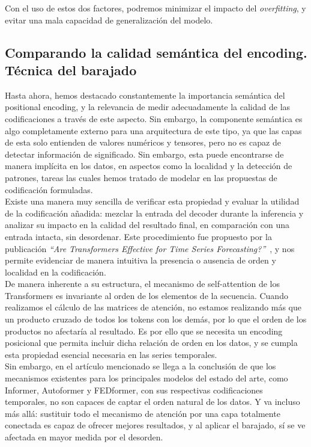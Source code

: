 Con el uso de estos dos factores, podremos minimizar el impacto del \textit{overfitting}, y evitar una mala capacidad de generalización del modelo.

\subsection{Comparando la calidad semántica del encoding. Técnica del barajado}

Hasta ahora, hemos destacado constantemente la importancia semántica del positional encoding, y la relevancia de medir adecuadamente la calidad de las codificaciones a través de este aspecto. Sin embargo, la componente semántica es algo completamente externo para una arquitectura de este tipo, ya que las capas de esta solo entienden de valores numéricos y tensores, pero no es capaz de detectar información de significado. Sin embargo, esta puede encontrarse de manera implícita en los datos, en aspectos como la localidad y la detección de patrones, tareas las cuales hemos tratado de modelar en las propuestas de codificación formuladas.\\

Existe una manera muy sencilla de verificar esta propiedad y evaluar la utilidad de la codificación añadida: mezclar la entrada del decoder durante la inferencia y analizar su impacto en la calidad del resultado final, en comparación con una entrada intacta, sin desordenar. Este procedimiento fue propuesto por la publicación \textit{``Are Transformers Effective for Time Series Forecasting?''}~\cite{zeng2022transformerseffectivetimeseries}, y nos permite evidenciar de manera intuitiva la presencia o ausencia de orden y localidad en la codificación.\\

De manera inherente a su estructura, el mecanismo de self-attention de los Transformers es invariante al orden de los elementos de la secuencia. Cuando realizamos el cálculo de las matrices de atención, no estamos realizando más que un producto cruzado de todos los tokens con los demás, por lo que el orden de los productos no afectaría al resultado. Es por ello que se necesita un encoding posicional que permita incluir dicha relación de orden en los datos, y se cumpla esta propiedad esencial necesaria en las series temporales.\\

Sin embargo, en el artículo mencionado se llega a la conclusión de que los mecanismos existentes para los principales modelos del estado del arte, como Informer, Autoformer y FEDformer, con sus respectivas codificaciones temporales, no son capaces de captar el orden natural de los datos. Y va incluso más allá: sustituir todo el mecanismo de atención por una capa totalmente conectada es capaz de ofrecer mejores resultados, y al aplicar el barajado, sí se ve afectada en mayor medida por el desorden. \\

